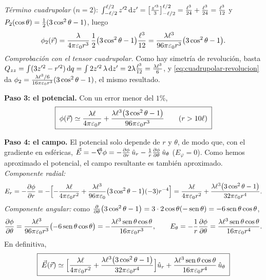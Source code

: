 \begin{resolucion}
\emph{Término cuadrupolar} ($n=2$): $\int_{-\ell/2}^{\ell/2}z'^{2}\,\mathrm{d} z'=\bigl[\tfrac{z'^{3}}{3}\bigr]_{-\ell/2}^{\ell/2}=\tfrac{\ell^{3}}{24}+\tfrac{\ell^{3}}{24}=\tfrac{\ell^{3}}{12}$ y
$P_{2}(\cos\theta)=\frac12(3\cos^{2}\theta-1)$, luego
\[
  \phi_{2}(\vec{r})=\frac{\lambda}{4\pi\varepsilon_{0} r^{3}}\,\frac12\bigl(3\cos^{2}\theta-1\bigr)\frac{\ell^{3}}{12}=\frac{\lambda\ell^{3}}{96\pi\varepsilon_{0} r^{3}}\bigl(3\cos^{2}\theta-1\bigr).
\]
\emph{Comprobación con el tensor cuadrupolar.} Como hay simetría de revolución, basta $Q_{zz}=\int(3z'^{2}-r'^{2})\,\mathrm{d} q=\int2z'^{2}\,\lambda\,\mathrm{d} z'=2\lambda\frac{\ell^{3}}{12}=\frac{\lambda\ell^{3}}{6}$,
y \cref{eq:cuadrupolar-revolucion} da $\phi_{2}=\frac{\lambda\ell^{3}/6}{16\pi\varepsilon_{0} r^{3}}(3\cos^{2}\theta-1)$, el mismo resultado.

\textbf{Paso 3: el potencial.} Con un error menor del $1\%$,
\[
  \boxed{\;\phi(\vec{r})\simeq\frac{\lambda\ell}{4\pi\varepsilon_{0} r}+\frac{\lambda\ell^{3}\bigl(3\cos^{2}\theta-1\bigr)}{96\pi\varepsilon_{0} r^{3}}\qquad(r>10\ell)\;}
\]

\textbf{Paso 4: el campo.} El potencial solo depende de $r$ y $\theta$, de modo que, con el gradiente en esféricas,
$\vec{E}=-\vec{\nabla}\phi=-\frac{\partial \phi}{\partial r}\,\hat{u}_{r}-\frac1r\frac{\partial \phi}{\partial \theta}\,\hat{u}_{\theta}$ ($E_\varphi=0$). Como hemos aproximado el potencial, el campo resultante es también aproximado.
\emph{Componente radial:}
\[
  E_r=-\frac{\partial \phi}{\partial r}=-\Bigl[-\frac{\lambda\ell}{4\pi\varepsilon_{0} r^{2}}+\frac{\lambda\ell^{3}}{96\pi\varepsilon_{0}}\bigl(3\cos^{2}\theta-1\bigr)(-3)r^{-4}\Bigr]
  =\frac{\lambda\ell}{4\pi\varepsilon_{0} r^{2}}+\frac{\lambda\ell^{3}\bigl(3\cos^{2}\theta-1\bigr)}{32\pi\varepsilon_{0} r^{4}} .
\]
\emph{Componente angular:} como $\frac{\partial }{\partial \theta}\bigl(3\cos^{2}\theta-1\bigr)=3\cdot2\cos\theta(-\operatorname{sen}\theta)=-6\operatorname{sen}\theta\cos\theta$,
\[
  \frac{\partial \phi}{\partial \theta}=\frac{\lambda\ell^{3}}{96\pi\varepsilon_{0} r^{3}}\bigl(-6\operatorname{sen}\theta\cos\theta\bigr)=-\frac{\lambda\ell^{3}\operatorname{sen}\theta\cos\theta}{16\pi\varepsilon_{0} r^{3}},\qquad
  E_\theta=-\frac1r\frac{\partial \phi}{\partial \theta}=\frac{\lambda\ell^{3}\operatorname{sen}\theta\cos\theta}{16\pi\varepsilon_{0} r^{4}} .
\]
En definitiva,
\[
  \boxed{\;\vec{E}(\vec{r})\simeq\Bigl[\frac{\lambda\ell}{4\pi\varepsilon_{0} r^{2}}+\frac{\lambda\ell^{3}\bigl(3\cos^{2}\theta-1\bigr)}{32\pi\varepsilon_{0} r^{4}}\Bigr]\hat{u}_{r}+\frac{\lambda\ell^{3}\operatorname{sen}\theta\cos\theta}{16\pi\varepsilon_{0} r^{4}}\,\hat{u}_{\theta}\;}
\]
\end{resolucion}



